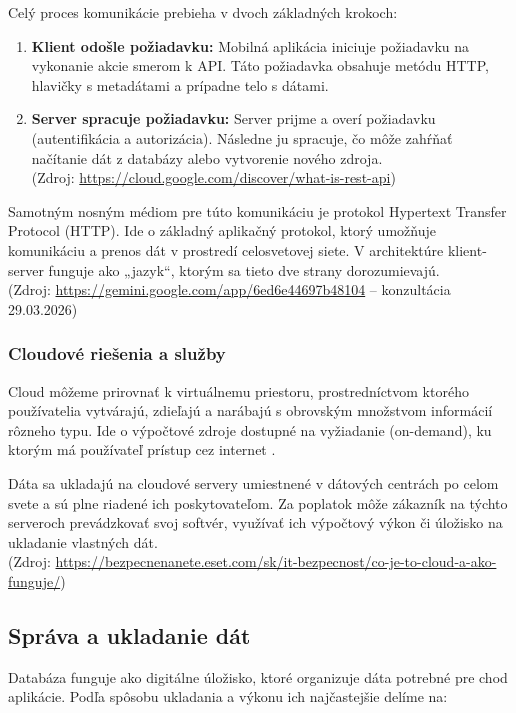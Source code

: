 Celý proces komunikácie prebieha v dvoch základných krokoch:
\begin{enumerate}
    \item \textbf{Klient odošle požiadavku:} Mobilná aplikácia iniciuje požiadavku na vykonanie akcie smerom k API. Táto požiadavka obsahuje metódu HTTP, hlavičky s metadátami a prípadne telo s dátami.
    \item \textbf{Server spracuje požiadavku:} Server prijme a overí požiadavku (autentifikácia a autorizácia). Následne ju spracuje, čo môže zahŕňať načítanie dát z databázy alebo vytvorenie nového zdroja. \\ (Zdroj: \url{https://cloud.google.com/discover/what-is-rest-api})
\end{enumerate}

Samotným nosným médiom pre túto komunikáciu je protokol \foreignlanguage{english}{Hypertext Transfer Protocol} (HTTP). Ide o základný aplikačný protokol, ktorý umožňuje komunikáciu a prenos dát v prostredí celosvetovej siete. V architektúre klient-server funguje ako „jazyk“, ktorým sa tieto dve strany dorozumievajú. \\ (Zdroj: \url{https://gemini.google.com/app/6ed6e44697b48104} -- konzultácia 29.03.2026)

\subsubsection{Cloudové riešenia a služby}
Cloud môžeme prirovnať k virtuálnemu priestoru, prostredníctvom ktorého používatelia vytvárajú, zdieľajú a narábajú s obrovským množstvom informácií rôzneho typu. Ide o výpočtové zdroje dostupné na vyžiadanie (\foreignlanguage{english}{on-demand}), ku ktorým má používateľ prístup cez internet \cite{eset_cloud}.

Dáta sa ukladajú na cloudové servery umiestnené v dátových centrách po celom svete a sú plne riadené ich poskytovateľom. Za poplatok môže zákazník na týchto serveroch prevádzkovať svoj softvér, využívať ich výpočtový výkon či úložisko na ukladanie vlastných dát. \\ (Zdroj: \url{https://bezpecnenanete.eset.com/sk/it-bezpecnost/co-je-to-cloud-a-ako-funguje/})

\subsection{Správa a ukladanie dát}
Databáza funguje ako digitálne úložisko, ktoré organizuje dáta potrebné pre chod aplikácie. Podľa spôsobu ukladania a výkonu ich najčastejšie delíme na:

